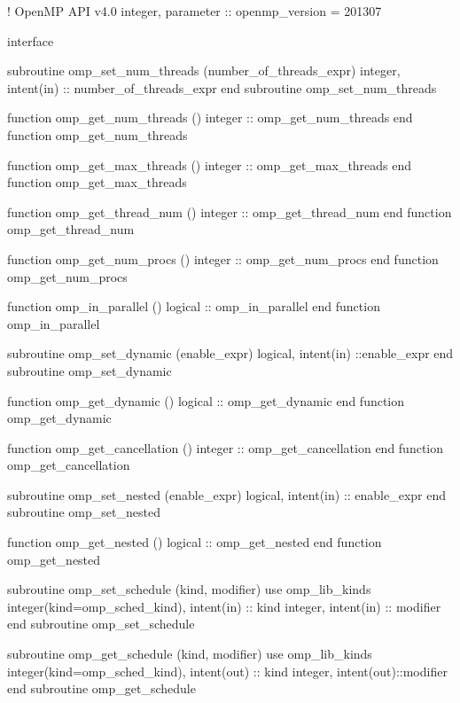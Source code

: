 {\begin{codepar}
!                                     OpenMP API v4.0
          integer, parameter :: openmp\_version = 201307

         interface

          subroutine omp\_set\_num\_threads (number\_of\_threads\_expr)
           integer, intent(in) :: number\_of\_threads\_expr
          end subroutine omp\_set\_num\_threads

          function omp\_get\_num\_threads ()
           integer :: omp\_get\_num\_threads
          end function omp\_get\_num\_threads

          function omp\_get\_max\_threads ()
           integer :: omp\_get\_max\_threads
          end function omp\_get\_max\_threads

          function omp\_get\_thread\_num ()
           integer :: omp\_get\_thread\_num
          end function omp\_get\_thread\_num

          function omp\_get\_num\_procs ()
           integer :: omp\_get\_num\_procs
          end function omp\_get\_num\_procs

          function omp\_in\_parallel ()
           logical :: omp\_in\_parallel
          end function omp\_in\_parallel

          subroutine omp\_set\_dynamic (enable\_expr)
           logical, intent(in) ::enable\_expr
          end subroutine omp\_set\_dynamic

          function omp\_get\_dynamic ()
           logical :: omp\_get\_dynamic
          end function omp\_get\_dynamic

          function omp\_get\_cancellation ()
           integer :: omp\_get\_cancellation
          end function omp\_get\_cancellation

          subroutine omp\_set\_nested (enable\_expr)
           logical, intent(in) :: enable\_expr
          end subroutine omp\_set\_nested

          function omp\_get\_nested ()
           logical :: omp\_get\_nested
          end function omp\_get\_nested

          subroutine omp\_set\_schedule (kind, modifier)
           use omp\_lib\_kinds
           integer(kind=omp\_sched\_kind), intent(in) :: kind
           integer, intent(in) :: modifier
          end subroutine omp\_set\_schedule

          subroutine omp\_get\_schedule (kind, modifier)
           use omp\_lib\_kinds
           integer(kind=omp\_sched\_kind), intent(out) :: kind
           integer, intent(out)::modifier
          end subroutine omp\_get\_schedule


\end{codepar}}
